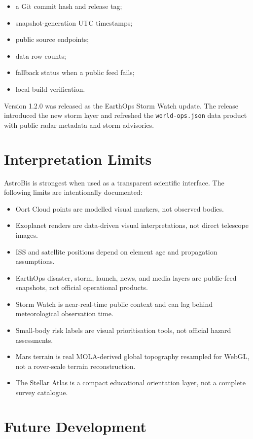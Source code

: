 \documentclass[11pt,a4paper]{article}
\begin{document}
\begin{itemize}[leftmargin=*]
  \item a Git commit hash and release tag;
  \item snapshot-generation UTC timestamps;
  \item public source endpoints;
  \item data row counts;
  \item fallback status when a public feed fails;
  \item local build verification.
\end{itemize}

Version 1.2.0 was released as the EarthOps Storm Watch update. The release introduced the new storm layer and refreshed the \texttt{world-ops.json} data product with public radar metadata and storm advisories.

\section{Interpretation Limits}

AstroBis is strongest when used as a transparent scientific interface. The following limits are intentionally documented:

\begin{itemize}[leftmargin=*]
  \item Oort Cloud points are modelled visual markers, not observed bodies.
  \item Exoplanet renders are data-driven visual interpretations, not direct telescope images.
  \item ISS and satellite positions depend on element age and propagation assumptions.
  \item EarthOps disaster, storm, launch, news, and media layers are public-feed snapshots, not official operational products.
  \item Storm Watch is near-real-time public context and can lag behind meteorological observation time.
  \item Small-body risk labels are visual prioritisation tools, not official hazard assessments.
  \item Mars terrain is real MOLA-derived global topography resampled for WebGL, not a rover-scale terrain reconstruction.
  \item The Stellar Atlas is a compact educational orientation layer, not a complete survey catalogue.
\end{itemize}

\section{Future Development}
\end{document}
